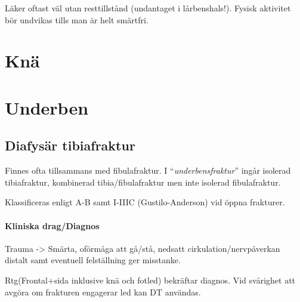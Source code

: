 \documentclass[
  letterpaper,
  DIV=11,
  numbers=noendperiod]{scrreport}
\let\oldparagraph\paragraph
\renewcommand{\paragraph}[1]{\oldparagraph{#1}\mbox{}}
\begin{document}
Läker oftast väl utan resttillstånd (undantaget i lårbenshals!). Fysisk
aktivitet bör undvikas tills man är helt smärtfri.

\hypertarget{knuxe4}{%
\section{Knä}\label{knuxe4}}

\hypertarget{underben}{%
\section{Underben}\label{underben}}

\hypertarget{diafysuxe4r-tibiafraktur}{%
\subsection{Diafysär tibiafraktur}\label{diafysuxe4r-tibiafraktur}}

Finnes ofta tillsammans med fibulafraktur. I ``\emph{underbensfraktur}''
ingår isolerad tibiafraktur, kombinerad tibia/fibulafraktur men inte
isolerad fibulafraktur.

\begin{tcolorbox}[enhanced jigsaw, colback=white, colbacktitle=quarto-callout-tip-color!10!white, toptitle=1mm, arc=.35mm, toprule=.15mm, rightrule=.15mm, titlerule=0mm, breakable, bottomrule=.15mm, colframe=quarto-callout-tip-color-frame, left=2mm, opacityback=0, coltitle=black, title=\textcolor{quarto-callout-tip-color}{\faLightbulb}\hspace{0.5em}{Klassifikation}, leftrule=.75mm, bottomtitle=1mm, opacitybacktitle=0.6]

Klassificeras enligt A-B samt I-IIIC (Gustilo-Anderson) vid öppna
frakturer.

\end{tcolorbox}

\hypertarget{kliniska-dragdiagnos-13}{%
\paragraph{Kliniska drag/Diagnos}\label{kliniska-dragdiagnos-13}}

Trauma -\textgreater{} Smärta, oförmåga att gå/stå, nedsatt
cirkulation/nervpåverkan distalt samt eventuell felställning ger
misstanke.

Rtg(Frontal+sida inklusive knä och fotled) bekräftar diagnos. Vid
svårighet att avgöra om frakturen engagerar led kan DT användas.
\end{document}
